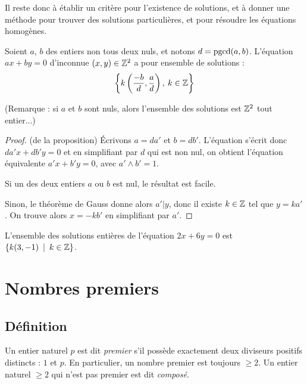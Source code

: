Il reste donc à établir un critère pour l'existence de solutions, et à donner une méthode pour trouver des solutions particulières, et pour résoudre les équations homogènes.

\begin{proposition}
Soient $a$, $b$ des entiers non tous deux  nuls, et notons $d = \operatorname{pgcd}(a,b)$. L'équation $ax+by=0$ d'inconnue $(x,y)\in \mathbb{Z}^2$ a pour ensemble de solutions :
\[
\left\{k\left(\frac{-b}{d} , \frac{a}{d}\right),\: k\in \mathbb{Z}\right\}
\]
\end{proposition}

(Remarque : si $a$ et $b$ sont nuls, alors l'ensemble des solutions est $\mathbb{Z}^2$ tout entier...)

\begin{proof}(de la proposition)
\'Ecrivons $a=da'$ et $b=db'$. L'équation s'écrit donc $da'x+db'y=0$ et en simplifiant par $d$ qui est non nul, on obtient l'équation équivalente $a'x+b'y=0$, avec $a'\wedge b'=1$.

Si un des deux entiers $a$ ou $b$ est nul, le résultat est facile.

Sinon, le théorème de Gauss donne alors $a'|y$, donc il existe $k\in \mathbb{Z}$ tel que $y = ka'$.  On trouve alors $x=-kb'$ en simplifiant par $a'$.
\end{proof}

\begin{exemple}
L'ensemble des solutions entières de l'équation $2x+6y=0$ est $\{k(3,-1)\:\mid\:k\in\mathbb{Z}\}$.
\end{exemple}








\section{Nombres premiers}

\subsection{Définition}

\begin{definition}
Un entier naturel $p$ est dit \emph{premier} s'il possède exactement deux diviseurs positifs distincts : $1$ et $p$.
En particulier, un nombre premier est toujours $\geq 2$.
Un entier naturel $\geq 2$ qui n'est pas premier est dit \emph{composé}.
\end{definition}


